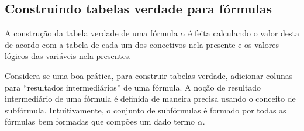 \subsection{Construindo tabelas verdade para f\'ormulas}

A construç\~ao da tabela verdade de uma
f\'ormula $\alpha$ \'e feita calculando o valor desta de acordo com a
tabela de cada um dos conectivos nela presente e os valores l\'ogicos
das vari\'aveis nela presentes.

Considera-se uma boa pr\'atica, para construir tabelas verdade,
adicionar colunas para ``resultados intermedi\'arios'' de uma
f\'ormula. A no\c{c}\~ao de resultado intermedi\'ario de uma f\'ormula
\'e definida de maneira precisa usando o conceito de
subf\'ormula. Intuitivamente, o conjunto de subf\'ormulas \'e formado
por todas as f\'ormulas bem formadas que comp\~oes um dado termo $\alpha$.


